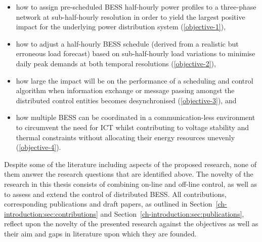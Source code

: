 \begin{itemize}
	\item how to assign pre-scheduled BESS half-hourly power profiles to a three-phase network at sub-half-hourly resolution in order to yield the largest positive impact for the underlying power distribution system (\ref{objective-1}),
	\item how to adjust a half-hourly BESS schedule (derived from a realistic but erroneous load forecast) based on sub-half-hourly load variations to minimise daily peak demands at both temporal resolutions (\ref{objective-2}),
	\item how large the impact will be on the performance of a scheduling and control algorithm when information exchange or message passing amongst the distributed control entities becomes desynchronised (\ref{objective-3}), and
	\item how multiple BESS can be coordinated in a communication-less environment to circumvent the need for ICT whilst contributing to voltage stability and thermal constraints without allocating their energy resources unevenly (\ref{objective-4}).
\end{itemize}

Despite some of the literature including aspects of the proposed research, none of them answer the research questions that are identified above.
The novelty of the research in this thesis consists of combining on-line and off-line control, as well as to assess and extend the control of distributed BESS.
All contributions, corresponding publications and draft papers, as outlined in Section~\ref{ch-introduction:sec:contributions} and Section~\ref{ch-introduction:sec:publications}, reflect upon the novelty of the presented research against the objectives as well as their aim and gaps in literature upon which they are founded.
